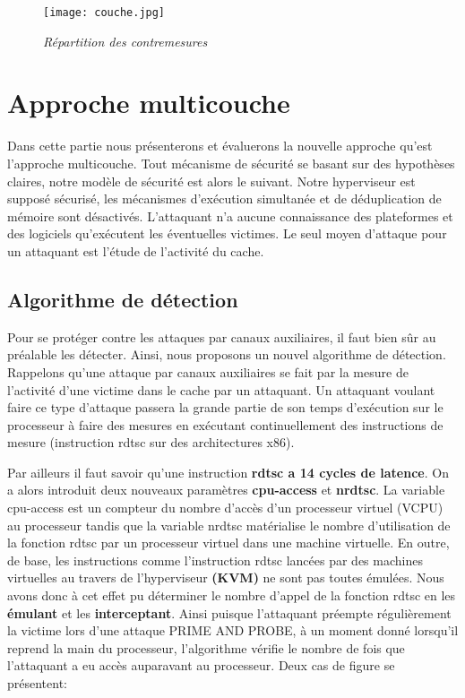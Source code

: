 \begin{figure}[h!]
      \centering \texttt{[image: couche.jpg]}          
      \caption{\it Répartition des contremesures}
\end{figure}  
\chapter{Approche multicouche} \newline{}

Dans cette partie nous présenterons et évaluerons la nouvelle approche qu’est l’approche multicouche. Tout mécanisme de sécurité se basant sur des hypothèses claires, notre modèle de sécurité est alors le suivant. Notre hyperviseur est supposé  sécurisé, les mécanismes d'exécution simultanée  et de déduplication de mémoire sont désactivés. L’attaquant n’a aucune connaissance des plateformes et des logiciels qu’exécutent les éventuelles victimes. Le seul moyen d’attaque pour un attaquant est l’étude de l’activité du cache.

\section{Algorithme de détection}
Pour se protéger contre les attaques par canaux auxiliaires, il faut bien sûr  au préalable les détecter. Ainsi, nous proposons un nouvel algorithme de détection. Rappelons qu’une attaque par canaux auxiliaires  se fait par la mesure de l’activité d’une victime dans le  cache par un attaquant. Un attaquant voulant faire ce type d’attaque passera la grande partie de son temps d’exécution sur le processeur à faire des mesures en exécutant continuellement des instructions de mesure (instruction rdtsc sur des architectures x86).\newline

Par ailleurs il faut savoir qu’une instruction \textbf{ rdtsc a 14 cycles de latence}. On a alors introduit deux nouveaux paramètres \textbf{cpu-access} et\textbf{ nrdtsc}. La variable cpu-access est un compteur du nombre d’accès d’un processeur virtuel (VCPU) au processeur tandis que la variable nrdtsc matérialise le nombre d’utilisation de la fonction rdtsc par un processeur virtuel dans une machine virtuelle. En outre, de base, les instructions  comme  l’instruction rdtsc lancées par des machines virtuelles au travers de l’hyperviseur \textbf{(KVM)} ne sont pas toutes émulées. Nous avons donc à cet effet pu déterminer le nombre d’appel de la fonction rdtsc en les \textbf{ émulant} et les \textbf{interceptant}. Ainsi puisque l’attaquant préempte régulièrement la victime lors d’une attaque PRIME AND PROBE, à un moment donné lorsqu’il reprend la main du processeur,  l’algorithme vérifie le nombre de fois que l’attaquant a eu accès auparavant au processeur. Deux cas de figure se présentent:

